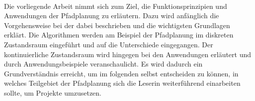 
\kurzfassung

\paragraph*{}

Die vorliegende Arbeit nimmt sich zum Ziel, die Funktionsprinzipien und Anwendungen der Pfadplanung zu erläutern. Dazu wird anfänglich die Vorgehensweise bei der dabei beschrieben und die wichtigsten Grundlagen erklärt. Die Algorithmen werden am Beispiel der Pfadplanung im diskreten Zustandsraum eingeführt und auf die Unterschiede eingegangen. Der kontinuierliche Zustandsraum wird hingegen bei den Anwendungen erläutert und durch Anwendungsbeispiele veranschaulicht.
Es wird dadurch ein Grundverständnis erreicht, um im folgenden selbst entscheiden zu können, in welches Teilgebiet der Pfadplanung sich die Leserin weiterführend einarbeiten sollte, um Projekte umzusetzen.

